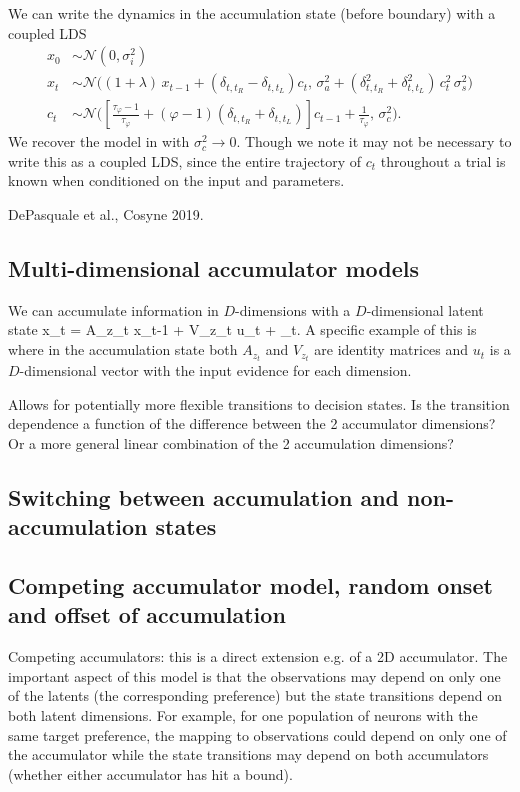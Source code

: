 \documentclass{article}
\begin{document}
We can write the dynamics in the accumulation state (before boundary) with a coupled LDS
\begin{align*}
x_0 & \sim \mathcal{N}(0, \sigma_i^2) \\
x_t & \sim \mathcal{N} \bigg((1 + \lambda) \, x_{t-1} + ( \delta_{t,t_R} -  \delta_{t,t_L} ) c_t , \, \sigma_a^2 + (\delta_{t,t_R}^2 + \delta_{t,t_L}^2)\,  c_t^2 \, \sigma_s^2 \bigg)\\
c_t & \sim \mathcal{N} \bigg(\left[ \frac{\tau_\varphi - 1}{\tau_\varphi} + (\varphi - 1) (\delta_{t,t_R} + \delta_{t,t_L}) \right] c_{t-1} + \frac{1}{\tau_\varphi}, \, \sigma_c^2 \bigg).
\end{align*}
We recover the model in \cite{brunton2013rats} with $\sigma_c^2 \rightarrow 0$. Though we note it may not be necessary to write this as a coupled LDS, since the entire trajectory of $c_t$ throughout a trial is known when conditioned on the input and parameters. 

DePasquale et al., Cosyne 2019.

\subsection{Multi-dimensional accumulator models}
We can accumulate information in $D$-dimensions with a $D$-dimensional latent state
\be
x_t = A_{z_t} x_{t-1} + V_{z_t} u_t + \epsilon_t.
\ee
A specific example of this is where in the accumulation state both $A_{z_t}$ and $V_{z_t}$ are identity matrices and $u_t$ is a $D$-dimensional vector with the input evidence for each dimension. 

Allows for potentially more flexible transitions to decision states. Is the transition dependence a function of the difference between the 2 accumulator dimensions? Or a more general linear combination of the 2 accumulation dimensions? 

\subsection{Switching between accumulation and non-accumulation states}


\subsection{Competing accumulator model, random onset and offset of accumulation}
Competing accumulators: this is a direct extension e.g. of a 2D accumulator. The important aspect of this model is that the observations may depend on only one of the latents (the corresponding preference) but the state transitions depend on both latent dimensions. For example, for one population of neurons with the same target preference, the mapping to observations could depend on only one of the accumulator while the state transitions may depend on both accumulators (whether either accumulator has hit a bound). 
\end{document}
